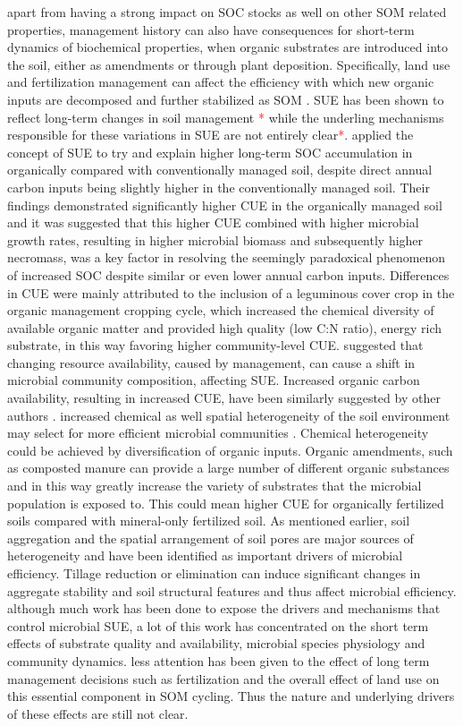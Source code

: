 \documentclass[12pt]{report}
\newcommand{\myRed}[1]{\textcolor{red}{#1}} %
\begin{document}
		apart from having a strong impact on SOC stocks as well on other SOM related properties, management history can also have consequences for short-term dynamics of biochemical properties, when organic substrates are introduced into the soil, either as amendments or through plant deposition. Specifically, land use and fertilization management can affect the efficiency with which new organic inputs are decomposed and further stabilized as SOM \citep{lee2014}. SUE has been shown to reflect long-term changes in soil management \myRed{*} while the underling mechanisms responsible for these variations in SUE are not entirely clear\myRed{*}.
		\citep{kallenbach2015} applied the concept of SUE to try and explain higher long-term SOC accumulation in organically compared with conventionally managed soil, despite direct annual carbon inputs being slightly higher in the conventionally managed soil. Their findings demonstrated significantly higher CUE in the organically managed soil and it was suggested that this higher CUE combined with higher microbial growth rates, resulting in higher microbial biomass and subsequently higher necromass, was a key factor in resolving the seemingly paradoxical phenomenon of increased SOC despite similar or even lower annual carbon inputs. Differences in CUE were mainly attributed to the inclusion of a leguminous cover crop in the organic management cropping cycle, which increased the chemical diversity of available organic matter and provided high quality (low C:N ratio), energy rich substrate, in this way favoring higher community-level CUE. 
		\citet{roller2015} suggested that changing resource availability, caused by management, can cause a shift in microbial community composition, affecting SUE. Increased organic carbon availability, resulting in increased CUE, have been similarly suggested by other authors \citep{cotrufo2013}.
		increased chemical as well spatial heterogeneity of the soil environment may select for more efficient microbial communities \citep{pfeiffer2001, nunan2017}. Chemical heterogeneity could be achieved by diversification of organic inputs. Organic amendments, such as composted manure can provide a large number of different organic substances \citep{zbytniewski2005} and in this way greatly increase the  variety of substrates that the microbial population is exposed to. This could mean higher CUE for organically fertilized soils compared with mineral-only fertilized soil.
		As mentioned earlier, soil aggregation and the spatial arrangement of soil pores are major sources of heterogeneity and have been identified as important drivers of microbial efficiency\citep{kravchenko2019}.   
		Tillage reduction or elimination can induce significant changes in aggregate stability and soil structural features and thus affect microbial efficiency.
		although much work has been done to expose the drivers and mechanisms that control microbial SUE, a lot of this work has concentrated on the short term effects of substrate quality and availability, microbial species physiology and community dynamics. less attention has been given to the effect of long term management decisions such as fertilization and the overall effect of land use on this essential component in SOM cycling. Thus the nature and underlying drivers of these effects are still not clear.   
			
\end{document}
